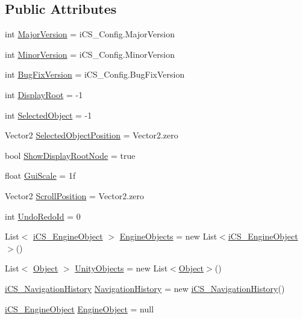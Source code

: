 \subsection*{Public Attributes}
\begin{DoxyCompactItemize}
\item 
int \hyperlink{classi_c_s___storage_imp_a04f4ac9776002b4e3d1d0c7a62b62ace}{Major\+Version} = i\+C\+S\+\_\+\+Config.\+Major\+Version
\item 
int \hyperlink{classi_c_s___storage_imp_a4b0896c23eda86c96fe754c9ad24f98c}{Minor\+Version} = i\+C\+S\+\_\+\+Config.\+Minor\+Version
\item 
int \hyperlink{classi_c_s___storage_imp_a84f9e30e4ff58151ca490cd5ece58451}{Bug\+Fix\+Version} = i\+C\+S\+\_\+\+Config.\+Bug\+Fix\+Version
\item 
int \hyperlink{classi_c_s___storage_imp_adefd9152c577c5e670c53136280f61b8}{Display\+Root} = -\/1
\item 
int \hyperlink{classi_c_s___storage_imp_aab60dd1eaaa3f322278473bd55ba45d4}{Selected\+Object} = -\/1
\item 
Vector2 \hyperlink{classi_c_s___storage_imp_af3246cbcd84b19800e2afe46fecfec6f}{Selected\+Object\+Position} = Vector2.\+zero
\item 
bool \hyperlink{classi_c_s___storage_imp_aa0a4d92afa22221eca4c8c04cc606174}{Show\+Display\+Root\+Node} = true
\item 
float \hyperlink{classi_c_s___storage_imp_a6e940c822b8606f626744774450e5e2a}{Gui\+Scale} = 1f
\item 
Vector2 \hyperlink{classi_c_s___storage_imp_abae5052e656f28aa226f290b581d4ec4}{Scroll\+Position} = Vector2.\+zero
\item 
int \hyperlink{classi_c_s___storage_imp_ae5be71592e9bb544c2c4718ce13cfb3a}{Undo\+Redo\+Id} = 0
\item 
List$<$ \hyperlink{classi_c_s___engine_object}{i\+C\+S\+\_\+\+Engine\+Object} $>$ \hyperlink{classi_c_s___storage_imp_a8b5f40004724c1eac18c125dfed1e77e}{Engine\+Objects} = new List$<$\hyperlink{classi_c_s___engine_object}{i\+C\+S\+\_\+\+Engine\+Object}$>$()
\item 
List$<$ \hyperlink{i_c_s___logic_8cs_a5b2c8b05b9a357906d7f9e5b2c1e154d}{Object} $>$ \hyperlink{classi_c_s___storage_imp_a285e49a4ca85b3feff04b9e75c19c2f4}{Unity\+Objects} = new List$<$\hyperlink{i_c_s___logic_8cs_a5b2c8b05b9a357906d7f9e5b2c1e154d}{Object}$>$()
\item 
\hyperlink{classi_c_s___navigation_history}{i\+C\+S\+\_\+\+Navigation\+History} \hyperlink{classi_c_s___storage_imp_a3677485efa65faf577ad1a23571aa236}{Navigation\+History} = new \hyperlink{classi_c_s___navigation_history}{i\+C\+S\+\_\+\+Navigation\+History}()
\item 
\hyperlink{classi_c_s___engine_object}{i\+C\+S\+\_\+\+Engine\+Object} \hyperlink{classi_c_s___storage_imp_a52d7f87304a8de2af04059d859a1f4ed}{Engine\+Object} = null
\end{DoxyCompactItemize}

